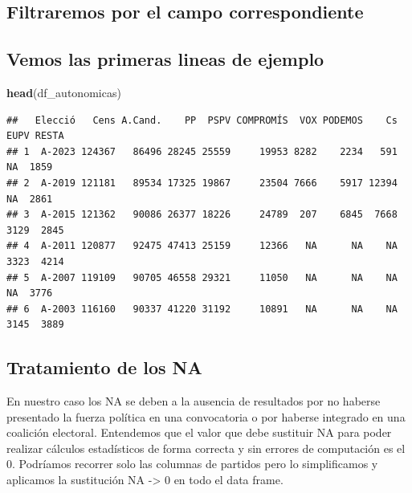 \documentclass[
]{article}
\newenvironment{Shaded}{\begin{snugshade}}{\end{snugshade}}
\newcommand{\FunctionTok}[1]{\textcolor[rgb]{0.13,0.29,0.53}{\textbf{#1}}}
\newcommand{\NormalTok}[1]{#1}
\newcommand{\OtherTok}[1]{\textcolor[rgb]{0.56,0.35,0.01}{#1}}
\newcommand{\SpecialCharTok}[1]{\textcolor[rgb]{0.81,0.36,0.00}{\textbf{#1}}}
\newcommand{\StringTok}[1]{\textcolor[rgb]{0.31,0.60,0.02}{#1}}
\begin{document}
\hypertarget{filtraremos-por-el-campo-correspondiente}{%
\subsection{Filtraremos por el campo
correspondiente}\label{filtraremos-por-el-campo-correspondiente}}

\begin{Shaded}
\end{Shaded}

\hypertarget{vemos-las-primeras-lineas-de-ejemplo}{%
\subsection{Vemos las primeras lineas de
ejemplo}\label{vemos-las-primeras-lineas-de-ejemplo}}

\begin{Shaded}
\begin{Highlighting}[]
\FunctionTok{head}\NormalTok{(df\_autonomicas)}
\end{Highlighting}
\end{Shaded}

\begin{verbatim}
##   Elecció   Cens A.Cand.    PP  PSPV COMPROMÍS  VOX PODEMOS    Cs EUPV RESTA
## 1  A-2023 124367   86496 28245 25559     19953 8282    2234   591   NA  1859
## 2  A-2019 121181   89534 17325 19867     23504 7666    5917 12394   NA  2861
## 3  A-2015 121362   90086 26377 18226     24789  207    6845  7668 3129  2845
## 4  A-2011 120877   92475 47413 25159     12366   NA      NA    NA 3323  4214
## 5  A-2007 119109   90705 46558 29321     11050   NA      NA    NA   NA  3776
## 6  A-2003 116160   90337 41220 31192     10891   NA      NA    NA 3145  3889
\end{verbatim}

\hypertarget{tratamiento-de-los-na}{%
\subsection{Tratamiento de los NA}\label{tratamiento-de-los-na}}

En nuestro caso los NA se deben a la ausencia de resultados por no
haberse presentado la fuerza política en una convocatoria o por haberse
integrado en una coalición electoral. Entendemos que el valor que debe
sustituir NA para poder realizar cálculos estadísticos de forma correcta
y sin errores de computación es el 0. Podríamos recorrer solo las
columnas de partidos pero lo simplificamos y aplicamos la sustitución NA
-\textgreater{} 0 en todo el data frame.
\end{document}
